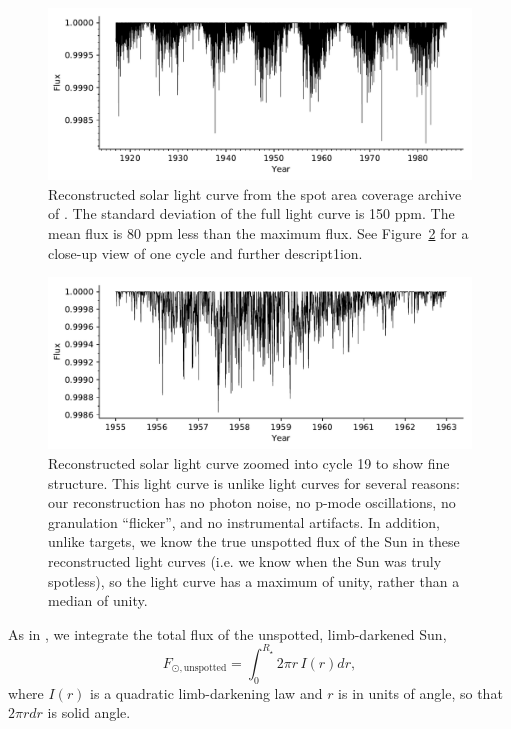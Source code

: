 \begin{figure}
    \centering
    \includegraphics[scale=0.9]{howard/full_lc.pdf}
    \caption{Reconstructed solar light curve from the spot area coverage archive of \citet{Howard1984}. The standard deviation of the full light curve is 150 ppm. The mean flux is 80 ppm less than the maximum flux. See Figure~\ref{fig:cycle19} for a close-up view of one cycle and further descript1ion.}
    \label{fig:lc}
\end{figure}

\begin{figure}
    \centering
    \includegraphics[scale=0.9]{howard/cycle19.pdf}
    \caption{Reconstructed solar light curve zoomed into cycle 19 to show fine structure. This light curve is unlike \kepler light curves for several reasons: our reconstruction has no photon noise, no p-mode oscillations, no granulation ``flicker'', and no instrumental artifacts. In addition, unlike \kepler targets, we know the true unspotted flux of the Sun in these reconstructed light curves (i.e. we know when the Sun was truly spotless), so the light curve has a maximum of unity, rather than a median of unity.}
    \label{fig:cycle19}
\end{figure}

As in \citet{Morris2018b}, we integrate the total flux of the unspotted, limb-darkened Sun,
\begin{equation}
F_{\odot, \mathrm{unspotted}} = \int_{0}^{R_\star} 2 \pi r \, I(r) dr,
\end{equation}
where $I(r)$ is a quadratic limb-darkening law and $r$ is in units of angle, so that $2\pi rdr$ is solid angle.

